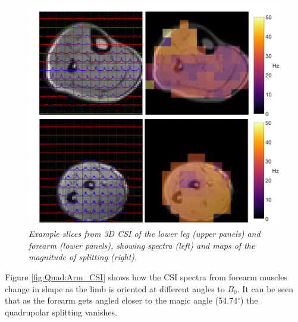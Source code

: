 \documentclass[class=article, crop=false]{standalone}
\begin{document}
\begin{figure}
    \centering
    \includegraphics[width=1\textwidth]{Figures/Quad/Calf_Arm_CSI.png}
    \caption{\textit{Example slices from 3D CSI of the lower leg (upper panels) and forearm (lower panels), showing spectra (left) and maps of the magnitude of splitting (right).}}
    \label{fig:Quad:Calf_Arm_CSI}
\end{figure}

Figure \ref{fig:Quad:Arm_CSI} shows how the CSI spectra from forearm muscles change in shape as the limb is oriented at different angles to $B_0$. It can be seen that as the forearm gets angled closer to the magic angle (54.74$^\circ$) the quadrupolar splitting vanishes. 
\end{document}
